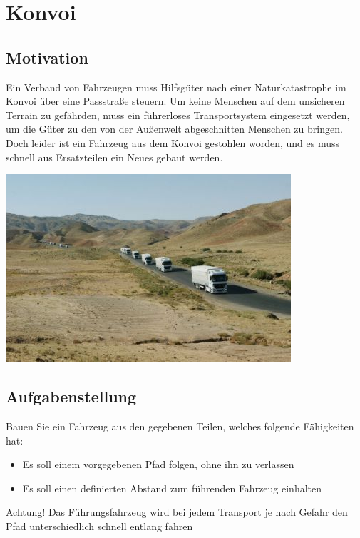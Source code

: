 \chapter{Konvoi}
\section{Motivation}
Ein Verband von Fahrzeugen muss Hilfsgüter nach einer Naturkatastrophe im Konvoi über
eine Passstraße steuern. Um keine Menschen auf dem unsicheren Terrain zu gefährden, muss
ein führerloses Transportsystem eingesetzt werden, um die Güter zu den von der Außenwelt
abgeschnitten Menschen zu bringen. Doch leider ist ein Fahrzeug aus dem Konvoi gestohlen
worden, und es muss schnell aus Ersatzteilen ein Neues gebaut werden.

\begin{capfigure}[Konvoi]
	\includegraphics[width=\textwidth]{images/konvoi}
\end{capfigure}

\section{Aufgabenstellung}
Bauen Sie ein Fahrzeug aus den gegebenen Teilen, welches folgende Fähigkeiten hat:
\begin{itemize}
	\item Es soll einem vorgegebenen Pfad folgen, ohne ihn zu verlassen
	\item Es soll einen definierten Abstand zum führenden Fahrzeug einhalten
\end{itemize}

Achtung! Das Führungsfahrzeug wird bei jedem Transport je nach Gefahr den Pfad unterschiedlich
schnell entlang fahren

